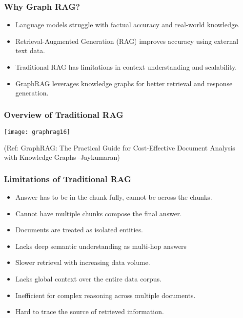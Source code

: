	


\begin{frame}[fragile]\frametitle{Why Graph RAG?}
    \begin{itemize}
        \item Language models struggle with factual accuracy and real-world knowledge.
        \item Retrieval-Augmented Generation (RAG) improves accuracy using external text data.
        \item Traditional RAG has limitations in context understanding and scalability.
        \item GraphRAG leverages knowledge graphs for better retrieval and response generation.
    \end{itemize}
\end{frame}

\begin{frame}[fragile]\frametitle{Overview of Traditional RAG}
	
	\begin{center}
	\texttt{[image: graphrag16]}
	
	{\tiny (Ref: GraphRAG: The Practical Guide for Cost-Effective Document Analysis with Knowledge Graphs -Jaykumaran)}
	\end{center}	
\end{frame}

\begin{frame}[fragile]\frametitle{Limitations of Traditional RAG}
    \begin{itemize}
		\item Answer has to be in the chunk fully, cannot be across the chunks.
		\item Cannot have multiple chunks compose the final answer.
        \item Documents are treated as isolated entities.
        \item Lacks deep semantic understanding as multi-hop answers
        \item Slower retrieval with increasing data volume.
        \item Lacks global context over the entire data corpus.
        \item Inefficient for complex reasoning across multiple documents.
        \item Hard to trace the source of retrieved information.
    \end{itemize}
\end{frame}

